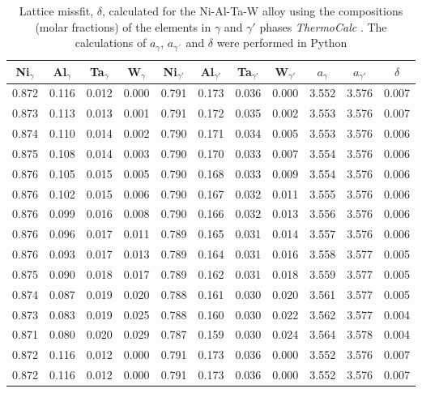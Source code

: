 \begin{table}[H]
    \centering
    \begin{tabular}{rrrrrrrrrrr}
        \multicolumn{1}{c}{Ni$_\gamma$} & \multicolumn{1}{c}{Al$_\gamma$} & \multicolumn{1}{c}{Ta$_\gamma$} & \multicolumn{1}{c}{W$_\gamma$} & \multicolumn{1}{c}{Ni$_{\gamma'}$} & \multicolumn{1}{c}{Al$_{\gamma'}$} & \multicolumn{1}{c}{Ta$_{\gamma'}$} & \multicolumn{1}{c}{W$_{\gamma'}$} & \multicolumn{1}{c}{$a_\gamma$} & \multicolumn{1}{c}{$a_{\gamma'}$} & \multicolumn{1}{c}{$\delta$} \\ \hline \hline
        0.872 & 0.116 & 0.012 & 0.000 & 0.791 & 0.173 & 0.036 & 0.000 & 3.552 & 3.576 & 0.007 \\0.873 & 0.113 & 0.013 & 0.001 & 0.791 & 0.172 & 0.035 & 0.002 & 3.553 & 3.576 & 0.007 \\0.874 & 0.110 & 0.014 & 0.002 & 0.790 & 0.171 & 0.034 & 0.005 & 3.553 & 3.576 & 0.006 \\0.875 & 0.108 & 0.014 & 0.003 & 0.790 & 0.170 & 0.033 & 0.007 & 3.554 & 3.576 & 0.006 \\0.876 & 0.105 & 0.015 & 0.005 & 0.790 & 0.168 & 0.033 & 0.009 & 3.554 & 3.576 & 0.006 \\0.876 & 0.102 & 0.015 & 0.006 & 0.790 & 0.167 & 0.032 & 0.011 & 3.555 & 3.576 & 0.006 \\0.876 & 0.099 & 0.016 & 0.008 & 0.790 & 0.166 & 0.032 & 0.013 & 3.556 & 3.576 & 0.006 \\0.876 & 0.096 & 0.017 & 0.011 & 0.789 & 0.165 & 0.031 & 0.014 & 3.557 & 3.576 & 0.006 \\0.876 & 0.093 & 0.017 & 0.013 & 0.789 & 0.164 & 0.031 & 0.016 & 3.558 & 3.577 & 0.005 \\0.875 & 0.090 & 0.018 & 0.017 & 0.789 & 0.162 & 0.031 & 0.018 & 3.559 & 3.577 & 0.005 \\0.874 & 0.087 & 0.019 & 0.020 & 0.788 & 0.161 & 0.030 & 0.020 & 3.561 & 3.577 & 0.005 \\0.873 & 0.083 & 0.019 & 0.025 & 0.788 & 0.160 & 0.030 & 0.022 & 3.562 & 3.577 & 0.004 \\0.871 & 0.080 & 0.020 & 0.029 & 0.787 & 0.159 & 0.030 & 0.024 & 3.564 & 3.578 & 0.004 \\0.872 & 0.116 & 0.012 & 0.000 & 0.791 & 0.173 & 0.036 & 0.000 & 3.552 & 3.576 & 0.007 \\0.872 & 0.116 & 0.012 & 0.000 & 0.791 & 0.173 & 0.036 & 0.000 & 3.552 & 3.576 & 0.007
    \end{tabular}
    \caption{Lattice missfit, $\delta$, calculated for the Ni-Al-Ta-W alloy using the compositions (molar fractions) of the elements in $\gamma$ and $\gamma'$ phases  \textit{ThermoCalc} \citep{thermocalc}. The calculations of $a_\gamma$, $a_{\gamma´}$ and $\delta$ were performed in Python \citep{mygit}}
    \label{tab:tab11}
\end{table}

